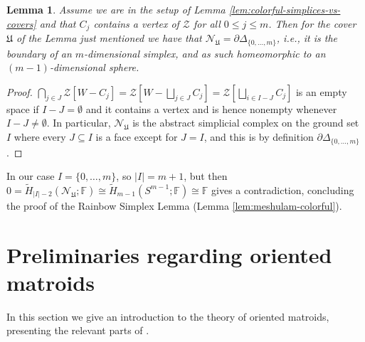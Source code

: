 \documentclass[a4paper,11pt,reqno, english]{amsart}
\newtheorem{lemma}[theorem]{Lemma}
\theoremstyle{definition}
\theoremstyle{remark}
\begin{document}
\begin{lemma}
    Assume we are in the setup of Lemma \ref{lem:colorful-simplices-vs-covers} and that $C_j$ contains a vertex of $\mathscr{Z}$ for all $0\leq j\leq m$. Then for the cover $\mathfrak{U}$ of the Lemma just mentioned we have that $\mathscr{N}_\mathfrak{U}=\partial\Delta_{\{0,\ldots,m\}}$, i.e., it is the boundary of an $m$-dimensional simplex, and as such homeomorphic to an $(m-1)$-dimensional sphere.
\end{lemma}
\begin{proof}
    $\bigcap_{j\in J}\mathscr{Z}[W-C_j]=\mathscr{Z}[W-\bigsqcup_{j\in J}C_j]=\mathscr{Z}[\bigsqcup_{i\in I-J}C_j]$ is an empty space if $I-J=\emptyset$ and it contains a vertex and is hence nonempty whenever $I-J\neq\emptyset$. In particular, $\mathscr{N}_\mathfrak{U}$ is the abstract simplicial complex on the ground set $I$ where every $J\subseteq I$ is a face except for $J=I$, and this is by definition $\partial\Delta_{\{0,\ldots,m\}}$.
\end{proof}
In our case $I=\{0,\ldots,m\}$, so $|I|=m+1$, but then $0=\tilde{H}_{|I|-2}(\mathscr{N}_\mathfrak{U};\mathbb{F})\cong\tilde{H}_{m-1}(S^{m-1};\mathbb{F})\cong\mathbb{F}$ gives a contradiction, concluding the proof of the Rainbow Simplex Lemma (Lemma \ref{lem:meshulam-colorful}).

\bigskip
\section{Preliminaries regarding oriented matroids}\label{sec:prelim-oms}
\bigskip

In this section we give an introduction to the theory of oriented matroids, presenting the relevant parts of \cite{OrientedMatroids}.
\end{document}

